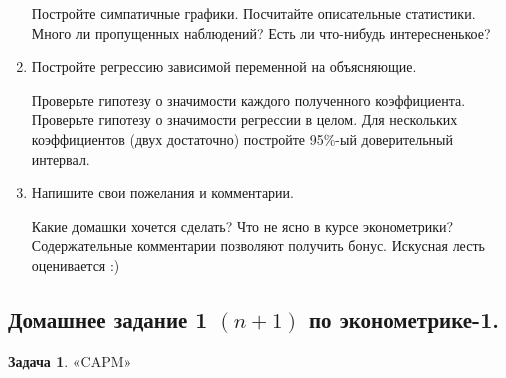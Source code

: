 \documentclass[12pt, a4paper]{article}
\begin{document}
\begin{enumerate}
Постройте симпатичные графики. Посчитайте описательные статистики. Много ли пропущенных наблюдений? Есть ли что-нибудь интересненькое?

\item Постройте регрессию зависимой переменной на объясняющие.

Проверьте гипотезу о значимости каждого полученного коэффициента. Проверьте гипотезу о значимости регрессии в целом. Для нескольких коэффициентов (двух достаточно) постройте 95\%-ый доверительный интервал.

\item Напишите свои пожелания и комментарии.

Какие домашки хочется сделать? Что не ясно в курсе эконометрики? Содержательные комментарии позволяют получить бонус. Искусная лесть оценивается :)

\end{enumerate}

\subsection{Домашнее задание 1 $(n+1)$ по эконометрике-1.}

\textbf{Задача 1}. «CAPM»
\end{document}
